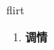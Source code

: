 
\begin{frame}
{\huge flirt}
\begin{center}
\begin{enumerate}\Large
  \item \textbf{调情}
\end{enumerate}
\end{center}
\end{frame}
